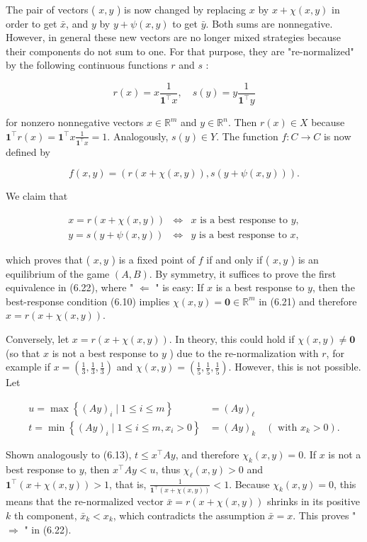 \documentclass[12pt]{article}
\begin{document}
The pair of vectors ( $x, y$ ) is now changed by replacing $x$ by $x+\chi(x, y)$ in order to get $\bar{x}$, and $y$ by $y+\psi(x, y)$ to get $\bar{y}$. Both sums are nonnegative. However, in general these new vectors are no longer mixed strategies because their components do not sum to one. For that purpose, they are "re-normalized" by the following continuous functions $r$ and $s$ :

$$
r(x)=x \frac{1}{\mathbf{1}^{\top} x}, \quad s(y)=y \frac{1}{\mathbf{1}^{\top} y}
$$

for nonzero nonnegative vectors $x \in \mathbb{R}^{m}$ and $y \in \mathbb{R}^{n}$. Then $r(x) \in X$ because $\mathbf{1}^{\top} r(x)=\mathbf{1}^{\top} x \frac{1}{\mathbf{1}^{\top} x}=1$. Analogously, $s(y) \in Y$. The function $f: C \rightarrow C$ is now defined by

$$
f(x, y)=(r(x+\chi(x, y)), s(y+\psi(x, y))) .
$$

We claim that

\[
\begin{array}{lll}
x=r(x+\chi(x, y)) & \Leftrightarrow & x \text { is a best response to } y,  \tag{6.22}\\
y=s(y+\psi(x, y)) & \Leftrightarrow & y \text { is a best response to } x,
\end{array}
\]

which proves that ( $x, y$ ) is a fixed point of $f$ if and only if ( $x, y$ ) is an equilibrium of the game $(A, B)$. By symmetry, it suffices to prove the first equivalence in (6.22), where " $\Leftarrow$ " is easy: If $x$ is a best response to $y$, then the best-response condition (6.10) implies $\chi(x, y)=\mathbf{0} \in \mathbb{R}^{m}$ in (6.21) and therefore $x=r(x+\chi(x, y))$.

Conversely, let $x=r(x+\chi(x, y))$. In theory, this could hold if $\chi(x, y) \neq \mathbf{0}$ (so that $x$ is not a best response to $y$ ) due to the re-normalization with $r$, for example if $x=\left(\frac{1}{3}, \frac{1}{3}, \frac{1}{3}\right)$ and $\chi(x, y)=\left(\frac{1}{5}, \frac{1}{5}, \frac{1}{5}\right)$. However, this is not possible. Let

$$
\begin{aligned}
u=\max \left\{(A y)_{i} \mid 1 \leq i \leq m\right\} \quad & =(A y)_{\ell} \\
t=\min \left\{(A y)_{i} \mid 1 \leq i \leq m, x_{i}>0\right\} & =(A y)_{k} \quad\left(\text { with } x_{k}>0\right) .
\end{aligned}
$$

Shown analogously to (6.13), $t \leq x^{\top} A y$, and therefore $\chi_{k}(x, y)=0$. If $x$ is not a best response to $y$, then $x^{\top} A y<u$, thus $\chi_{\ell}(x, y)>0$ and $\mathbf{1}^{\top}(x+\chi(x, y))>1$, that is, $\frac{1}{\mathbf{1}^{\top}(x+\chi(x, y))}<1$. Because $\chi_{k}(x, y)=0$, this means that the re-normalized vector $\bar{x}=r(x+\chi(x, y))$ shrinks in its positive $k$ th component, $\bar{x}_{k}<x_{k}$, which contradicts the assumption $\bar{x}=x$. This proves " $\Rightarrow$ " in (6.22).
\end{document}
